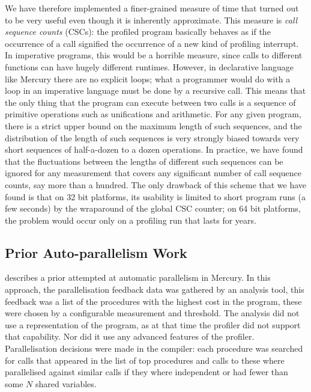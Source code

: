 We have therefore implemented a finer-grained measure of time
that turned out to be very useful
even though it is inherently approximate.
This measure is \emph{call sequence counts} (CSCs):
the profiled program basically behaves
as if the occurrence of a call signified
the occurrence of a new kind of profiling interrupt.
In imperative programs, this would be a horrible measure,
since calls to different functions can have hugely different runtimes.
However, in declarative language like Mercury there are no explicit loops;
what a programmer would do with a loop in an imperative language
must be done by a recursive call.
This means that the only thing that the program can execute between two calls
is a sequence of primitive operations such as unifications and arithmetic.
For any given program,
there is a strict upper bound on the maximum length of such sequences,
and the distribution of the length of such sequences
is very strongly biased towards very short sequences
of half-a-dozen to a dozen operations.
In practice, we have found that
the fluctuations between the lengths of different such sequences
can be ignored for any measurement
that covers any significant number of call sequence counts,
say more than a hundred.
The only drawback of this scheme that we have found
is that on 32 bit platforms,
its usability is limited to short program runs (a few seconds)
by the wraparound of the global CSC counter;
on 64 bit platforms, the problem would occur
only on a profiling run that lasts for years.

\subsection{Prior Auto-parallelism Work}

\citet{tannier:2007:parallel_mercury} describes a prior attempted at automatic
parallelism in Mercury.
In this approach, the parallelisation feedback data was gathered by an analysis
tool,
this feedback was a list of the procedures with the highest cost in the program,
these were chosen by a configurable measurement and threshold.
The analysis did not use a representation of the program,
as at that time the profiler did not support that capability.
Nor did it use any advanced features of the profiler.
Parallelisation decisions were made in the compiler:
each procedure was searched for calls that appeared in the list of top procedures
and calls to these where parallelised against similar calls if they
where independent or had fewer than some $N$ shared variables.

